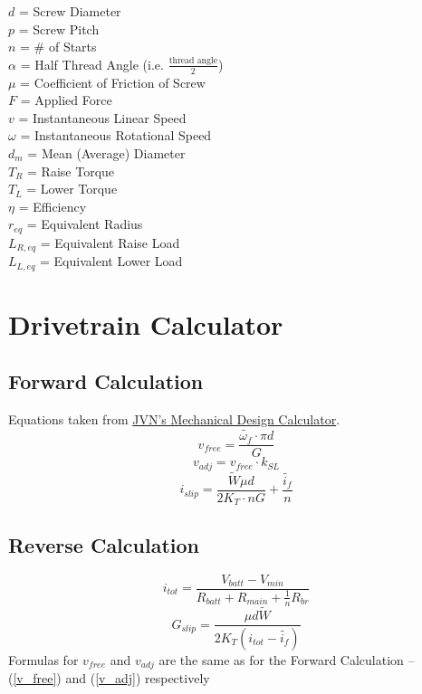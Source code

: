 \documentclass[11pt,a4paper,titlepage]{article}
\begin{document}
	$d$ = Screw Diameter \\
	$p$ = Screw Pitch \\
	$n$ = \# of Starts \\
	$\alpha$ = Half Thread Angle (i.e. $\frac{\text{thread angle}}{2}$) \\
	$\mu$ = Coefficient of Friction of Screw \\
	$F$ = Applied Force \\
	$v$ = Instantaneous Linear Speed \\
	$\omega$ = Instantaneous Rotational Speed \\
	$d_m$ = Mean (Average) Diameter \\
	$T_R$ = Raise Torque \\
	$T_L$ = Lower Torque \\
	$\eta$ = Efficiency \\
	$r_{eq}$ = Equivalent Radius \\
	$L_{R,eq}$ = Equivalent Raise Load \\
	$L_{L,eq}$ = Equivalent Lower Load
	
	\section{Drivetrain Calculator}
	\subsection{Forward Calculation}
	Equations taken from \href{https://www.chiefdelphi.com/uploads/default/original/3X/2/b/2bf9206b962f74ed5556a0ae936ef0bf365ac975.xlsx}{JVN's Mechanical Design Calculator}.
	\begin{equation} \label{v_free}
		v_{free} = \frac{\tilde{\omega_f} \cdot \pi d}{G}
	\end{equation}
	\begin{equation} \label{v_adj}
		v_{adj} = v_{free} \cdot k_{SL}
	\end{equation}
	\begin{equation}
		i_{slip} = \frac{\tilde{W} \mu d}{2 K_T \cdot n G} + \frac{\tilde{i_f}}{n}
	\end{equation}
	
	\subsection{Reverse Calculation}
	\begin{equation}
		i_{tot} = \frac{V_{batt} - V_{min}}{R_{batt} + R_{main} + \frac{1}{n}R_{br}}
	\end{equation}
	\begin{equation}
		G_{slip} = \frac{\mu d \tilde{W}}{2 K_T \left( i_{tot} - \tilde{i_f} \right)}
	\end{equation}
	Formulas for $v_{free}$ and $v_{adj}$ are the same as for the Forward Calculation -- (\ref{v_free}) and (\ref{v_adj}) respectively\\
	
\end{document}
